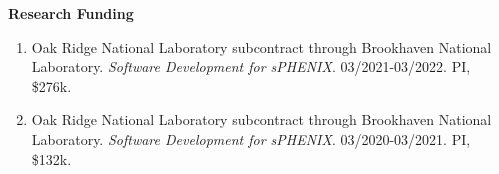 \documentclass[11pt]{article}
\begin{document}
\vspace{7pt}

\begin{flushleft}
	\LARGE\textbf{Research Funding}
	\vspace{4pt}
	\normalsize
	\begin{center}
		\begin{enumerate}
			\item Oak Ridge National Laboratory subcontract through Brookhaven National Laboratory. \textit{Software Development for sPHENIX}. 03/2021-03/2022. PI, \$276k.
			\item Oak Ridge National Laboratory subcontract through Brookhaven National Laboratory. \textit{Software Development for sPHENIX}. 03/2020-03/2021. PI, \$132k.
		\end{enumerate}
	\end{center}
\end{flushleft}


\vspace{7pt}
\end{document}

